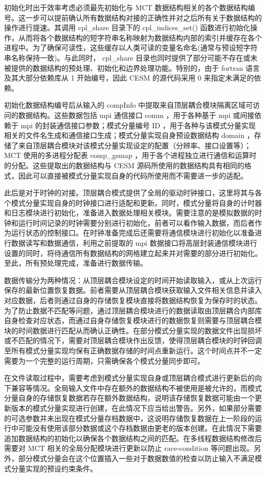 初始化时出于效率考虑必须最先初始化与 MCT 数据结构相关的各个数据结构编号。这一步可以提前确认所有数据结构对接的正确性并对之后所有关于数据结构的操作进行提速。其调用 cpl\_share 目录下的 cpl\_indices\_set() 函数进行初始化操作，从而将各个数据结构的短字符串名称映射为数据结构内部的索引并缓存在各个进程中。为了确保可读性，这些缓存以人类可读的变量名命名(通常与预设短字符串名称保持一致)。与此同时， cpl\_share 目录也同时提供了部分可能不存在或未被提供的数据结构的预处理、初始化和边界处理功能。特别的，由于 fortran 语言及其大部分依赖库从 1 开始编号，因此 CESM 的源代码采用 0 来指定未满足的依赖。

初始化数据结构编号后从输入的 compInfo 中提取来自顶层耦合模块隔离区域可访问的数据结构。这些数据包括 mpi 通信接口 comm ，用于各种基于 mpi 或间接依赖于 mpi 的封装通信接口参数；模式分量编号 ID ，用于各种与该模式分量实现相关的文件名生成和通信接口生成；模式分量实现自身预设数据结构 domain ，存储了来自顶层耦合模块对该模式分量实现设定的配置（分辨率、接口设置等）；MCT 使用的多进程分配表 comp\_gsmap ，用于各个进程独立进行通信和运算时的分配。这些提取出的数据结构与 CESM 源码所使用的数据结构具有相同的格式，因此可以直接被模式分量实现自身的代码所使用而不需要进一步的适配。

此后是对于时钟的对接。顶层耦合模式提供了全局的驱动时钟接口，这里将其与各个模式分量实现自身的时钟接口进行适配和更新。同时，模式分量将自身的计时器和日志模块进行初始化，准备进入数据处理相关模块。需要注意的是模拟数据的时钟和运行时间记录的时钟需要分别进行初始化，前者可以看作输入数据，而后者作为运行状态的控制接口。在时钟准备完成后还需要将通信模块进行初始化以准备进行数据读写和数据通信，利用之前提取的 mpi 数据接口将高层封装通信模块进行设置的同时，将待通信所有数据结构的网格建立起来并对需要的部分进行初始化。至此，所有预处理完成，准备进行数据传输。

数据传输分为两种情况：从顶层耦合模块设定的时间开始读取输入，或从上次运行保存的最新位置恢复数据。前者需要从顶层耦合模块获取输入文件相关信息并读入对应数据，后者则通过自身的存储恢复模块直接将数据结构恢复为保存时的状态。为了防止数据不匹配等问题，通过顶层耦合模块进行的数据读取由顶层耦合内部库自身检查对应状态，而通过自身存储恢复模块进行的数据恢复则需要与顶层耦合模块的时间数据进行匹配从而确认正确性。在部分模式分量实现的数据文件出现损坏或不匹配的情况下，需要对顶层耦合模块作出反馈，使得顶层耦合模块的时钟回调至所有模式分量实现均保有正确数据存储的时间点重新运行。这个时间点并不一定需要为一个完整的运行周期，只需确保各个模式分量同步即可。

在文件读取过程中，需要考虑到模式分量实现自身或顶层耦合模式进行更新后的向下兼容等情况。全局输入文件中存在额外的数据结构不被使用是被允许的，而模式分量自身的存储恢复数据若存在额外数据结构，说明该存储恢复数据可能由一个更新版本的模式分量实现进行创建，在此情况下应当给出警告。另外，如果部分需要的可选参数并未出现在模式分量存档数据中，这说明存储恢复数据在上一阶段的运行中可能没有使用该部分数据或这个存档数据由更老的版本创建。在此情况下需要追加数据结构的初始化以确保各个数据结构之间的匹配。在多线程数据结构修改后需要对 MCT 相关的全局分配模块进行更新以防止 race-condition 等问题出现。另外，部分模式分量会在这个位置插入一些对于数据数值的检查以防止输入不满足模式分量实现的预设约束条件。

